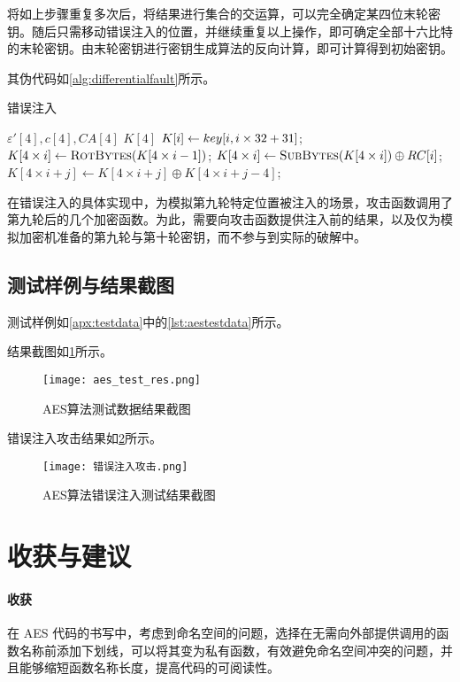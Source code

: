 \documentclass[a4paper, zihao=-4, UTF-8]{ctexart}
\begin{document}
	将如上步骤重复多次后，将结果进行集合的交运算，可以完全确定某四位末轮密钥。随后只需移动错误注入的位置，并继续重复以上操作，即可确定全部十六比特的末轮密钥。由末轮密钥进行密钥生成算法的反向计算，即可计算得到初始密钥。
	
	其伪代码如\cref{alg:differentialfault}所示。
	
	\begin{algorithm}[htbp]
		\caption{错误注入}
		\label{alg:differentialfault}
		\begin{algorithmic}[1]
			\Require $\varepsilon'[4], c[4], CA[4]$
			\Ensure $K[4]$
			\State $K[i]\gets key[i \time 32, i\times 32 + 31]$;
			\EndFor
			\State $K[4\times i]\gets \Call{RotBytes}{K[4\times i - 1]}$;
			\State $K[4\times i]\gets \Call{SubBytes}{K[4\times i]}\oplus RC[i]$;
			\State $K[4\times i + j]\gets K[4 \times i + j]\oplus K[4\times i + j - 4]$;
			\EndFor
			\EndFor
			\State {}
			\EndFunction
		\end{algorithmic}
	\end{algorithm}
	
	在错误注入的具体实现中，为模拟第九轮特定位置被注入的场景，攻击函数调用了第九轮后的几个加密函数。为此，需要向攻击函数提供注入前的结果，以及仅为模拟加密机准备的第九轮与第十轮密钥，而不参与到实际的破解中。
	
	\subsection{测试样例与结果截图}
	测试样例如\cref{apx:testdata}中的\cref{lst:aestestdata}所示。
	\par 结果截图如\cref{fig:aestestres}所示。
	\begin{figure}[htbp]
		\centering
		\texttt{[image: aes\_test\_res.png]}
		\caption{AES算法测试数据结果截图}
		\label{fig:aestestres}
	\end{figure}
	
	错误注入攻击结果如\cref{fig:aestestattack}所示。
	
	\begin{figure}[htbp]
		\centering
		\texttt{[image: 错误注入攻击.png]}
		\caption{AES算法错误注入测试结果截图}
		\label{fig:aestestattack}
	\end{figure}
	\section{收获与建议}
	\paragraph{收获} 在 AES 代码的书写中，考虑到命名空间的问题，选择在无需向外部提供调用的函数名称前添加下划线，可以将其变为私有函数，有效避免命名空间冲突的问题，并且能够缩短函数名称长度，提高代码的可阅读性。
	
\end{document}
